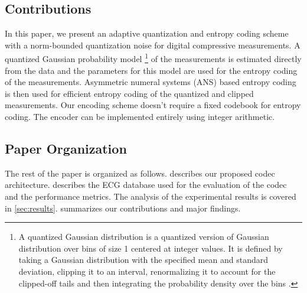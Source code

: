 \subsection{Contributions}
In this paper, we present an adaptive quantization and
entropy coding scheme with a
norm-bounded quantization noise
for digital compressive measurements.
A quantized Gaussian probability model
\footnote{A quantized Gaussian distribution is
a quantized version of Gaussian distribution over
bins of size 1 centered at integer values.
It is defined by taking a Gaussian distribution with
the specified mean and standard deviation, clipping
it to an interval, renormalizing it to account for
the clipped-off tails and then integrating the
probability density over the bins \cite{bamler2022constriction}.}
of the measurements
is estimated directly from the data
and the parameters for this model are used
for the entropy coding of the measurements.  
Asymmetric numeral systems (ANS) based
entropy coding is then used for efficient entropy coding
of the quantized and clipped measurements.
Our encoding scheme doesn't require a fixed codebook
for entropy coding.
The encoder can be implemented entirely using integer arithmetic.

\subsection{Paper Organization}
The rest of the paper is organized as follows.
 describes our proposed codec architecture.
 describes the ECG database
used for the evaluation of the codec and the
performance metrics.
The analysis of the experimental results is covered in \cref{sec:results}.
 summarizes our contributions and major findings.

